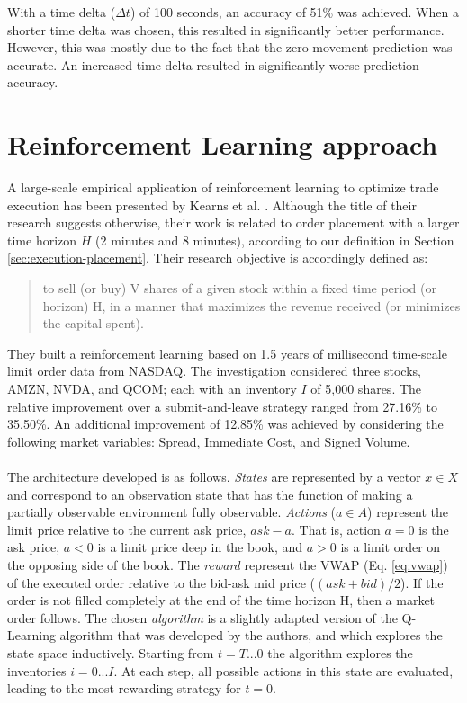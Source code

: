 With a time delta ($\Delta{t}$) of 100 seconds, an accuracy of 51\% was achieved.
When a shorter time delta was chosen, this resulted in significantly better performance. However, this was mostly due to the fact that the zero movement prediction was accurate.
An increased time delta resulted in significantly worse prediction accuracy.

\section{Reinforcement Learning approach}

A large-scale empirical application of reinforcement learning to optimize trade execution has been presented by Kearns et al. \cite{nevmyvaka2006reinforcement}.
Although the title of their research suggests otherwise, their work is related to order placement with a larger time horizon $H$ (2 minutes and 8 minutes), according to our definition in Section \ref{sec:execution-placement}.
Their research objective is accordingly defined as:
\begin{quote}
    to sell (or buy) V shares of a given stock within a fixed time period (or horizon) H, in a manner that maximizes the revenue received (or minimizes the capital spent).
\end{quote}
They built a reinforcement learning based on 1.5 years of millisecond time-scale limit order data from NASDAQ.
The investigation considered three stocks, AMZN, NVDA, and QCOM; each with an inventory $I$ of 5,000 shares.
The relative improvement over a submit-and-leave strategy ranged from 27.16\% to 35.50\%.
An additional improvement of 12.85\% was achieved by considering the following market variables: Spread, Immediate Cost, and Signed Volume.
\\
\\
The architecture developed is as follows.
\textit{States} are represented by a vector $x \in X$ and correspond to an observation state that has the function of making a  partially observable environment fully observable.
\textit{Actions} ($a \in A$) represent the limit price relative to the current ask price, $ask - a$. 
That is, action $a = 0$ is the ask price, $a < 0$ is a limit price deep in the book, and $a > 0$ is a limit order on the opposing side of the book.
The \textit{reward} represent the VWAP (Eq. \ref{eq:vwap}) of the executed order relative to the bid-ask mid price ($(ask + bid) / 2$).
If the order is not filled completely at the end of the time horizon H, then a market order follows.
The chosen \textit{algorithm} is a slightly adapted version of the Q-Learning algorithm that was developed by the authors, and which explores the state space inductively.
Starting from $t=T...0$ the algorithm explores the inventories $i=0...I$.
At each step, all possible actions in this state are evaluated, leading to the most rewarding strategy for $t=0$.